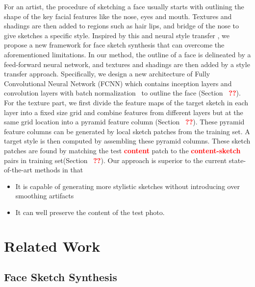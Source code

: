 \documentclass[10pt,twocolumn,letterpaper]{article}
\def\red[#1]{\textcolor{red}{\textbf{#1}}}
\begin{document}
For an artist, the procedure of sketching a face usually starts with outlining the shape of the key facial features like the nose, eyes and mouth. Textures and shadings are then added to regions such as hair lips, and bridge of the nose to give sketches a specific style. Inspired by this and neural style transfer \cite{gatys2015texture}, we propose a new framework for face sketch synthesis that can overcome the aforementioned limitations. In our method, the outline of a face is delineated by a feed-forward neural network, and textures and shadings are then added by a style transfer approach. Specifically, we design a new architecture of Fully Convolutional Neural Network (FCNN) which contains inception layers \cite{szegedy2015going} and convolution layers with batch normalization~\cite{Sergey2015batch} to outline the face (Section ~\red[??]). For the texture part, we first divide the feature maps of the target sketch in each layer into a fixed size grid and combine features from different layers but at the same grid location into a pyramid feature column (Section ~\red[??]). These pyramid feature columns can be generated by local sketch patches from the training set. A target style is then computed by assembling these pyramid columns. These sketch patches are found by matching the test \red[content] patch to the \red[content-sketch] pairs in training set(Section ~\red[??]). Our approach is superior to the current state-of-the-art methods in that 
\begin{itemize}
\item It is capable of generating more stylistic sketches without introducing over smoothing artifacts 
\item It can well preserve the content of the test photo.
\end{itemize}

\section{Related Work}

\subsection{Face Sketch Synthesis}
\end{document}
